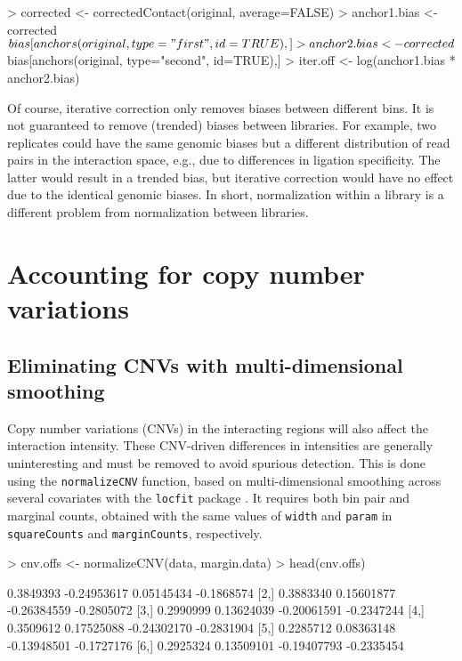 \documentclass[12pt]{report}
\renewenvironment{Schunk}{\vspace{0pt}}{\vspace{0pt}}
\newcommand{\code}[1]{{\small\texttt{#1}}}
\begin{document}
\begin{Schunk}
\begin{Sinput}
> corrected <- correctedContact(original, average=FALSE)
> anchor1.bias <- corrected$bias[anchors(original, type="first", id=TRUE),]
> anchor2.bias <- corrected$bias[anchors(original, type="second", id=TRUE),]
> iter.off <- log(anchor1.bias * anchor2.bias)
\end{Sinput}
\end{Schunk}

Of course, iterative correction only removes biases between different bins.
It is not guaranteed to remove (trended) biases between libraries.
For example, two replicates could have the same genomic biases but a different distribution of read pairs in the interaction space, e.g., due to differences in ligation specificity.
The latter would result in a trended bias, but iterative correction would have no effect due to the identical genomic biases.
In short, normalization within a library is a different problem from normalization between libraries.

\section{Accounting for copy number variations}
\label{sec:copy}

\subsection{Eliminating CNVs with multi-dimensional smoothing}
Copy number variations (CNVs) in the interacting regions will also affect the interaction intensity. 
These CNV-driven differences in intensities are generally uninteresting and must be removed to avoid spurious detection.
This is done using the \code{normalizeCNV} function, based on multi-dimensional smoothing across several covariates with the \code{locfit} package \citep{loader1999local}.
It requires both bin pair and marginal counts, obtained with the same values of \code{width} and \code{param} in \code{squareCounts} and \code{marginCounts}, respectively.

\begin{Schunk}
\begin{Sinput}
> cnv.offs <- normalizeCNV(data, margin.data)
> head(cnv.offs)
\end{Sinput}
\begin{Soutput}
          [,1]        [,2]        [,3]       [,4]
[1,] 0.3849393 -0.24953617  0.05145434 -0.1868574
[2,] 0.3883340  0.15601877 -0.26384559 -0.2805072
[3,] 0.2990999  0.13624039 -0.20061591 -0.2347244
[4,] 0.3509612  0.17525088 -0.24302170 -0.2831904
[5,] 0.2285712  0.08363148 -0.13948501 -0.1727176
[6,] 0.2925324  0.13509101 -0.19407793 -0.2335454
\end{Soutput}
\end{Schunk}
\end{document}
